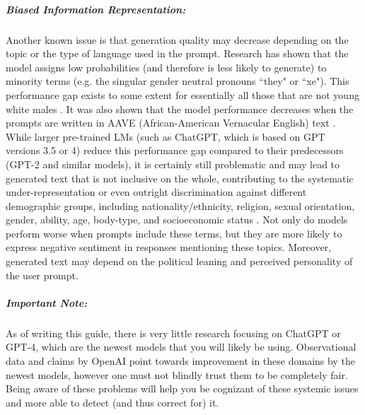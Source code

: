 \documentclass[12pt]{article}
\begin{document}
\subparagraph{Biased Information Representation:} Another known issue is that generation quality may decrease depending on the topic or the type of language used in the prompt. Research has shown that the model assigns low probabilities (and therefore is less likely to generate) to minority terms (e.g. the singular gender neutral pronouns ``they" or ``xe"). This performance gap exists to some extent for essentially all those that are not young white males \cite{Smith2022ImST,Zhang2021SociolectalAO}. It was also shown that the model performance decreases when the prompts are written in AAVE (African-American Vernacular English) text \cite{Groenwold2020DatsWI}. While larger pre-trained LMs (such as ChatGPT, which is based on GPT versions 3.5 or 4) reduce this performance gap compared to their predecessors (GPT-2 and similar models), it is certainly still problematic and may lead to generated text that is not inclusive on the whole, contributing to the systematic under-representation or even outright discrimination against 
different demographic groups, including nationality/ethnicity, religion, sexual orientation, gender, ability, age, body-type, and socioeconomic status
\cite{Chang2023LanguageMB}. Not only do models perform worse when prompts include these terms, but they are more likely to express negative sentiment in responses mentioning these topics. Moreover, generated text may depend on the political leaning and perceived personality of the user prompt. 

\subparagraph{Important Note:} As of writing this guide, there is very little research focusing on ChatGPT or GPT-4, which are the newest models that you will likely be using. Observational data and claims by OpenAI point towards improvement in these domains by the newest models, however one must not blindly trust them to be completely fair. Being aware of these problems will help you be cognizant of these systemic issues and more able to detect (and thus correct for) it.

\end{document}

